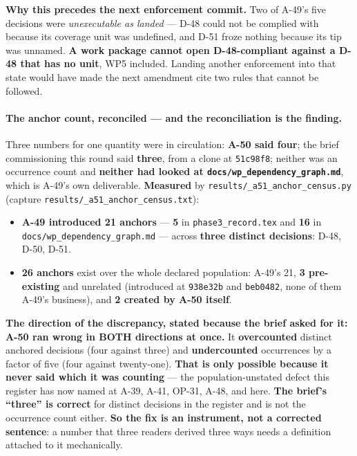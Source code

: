 \documentclass[
  10pt,
]{article}
\providecommand{\tightlist}{%
  \setlength{\itemsep}{0pt}\setlength{\parskip}{0pt}}
\begin{document}
\textbf{Why this precedes the next enforcement commit.} Two of A-49's five decisions were \emph{unexecutable as landed} --- D-48 could not be complied with because its coverage unit was undefined, and D-51 froze nothing because its tip was unnamed. \textbf{A work package cannot open D-48-compliant against a D-48 that has no unit}, WP5 included. Landing another enforcement into that state would have made the next amendment cite two rules that cannot be followed.

\paragraph{The anchor count, reconciled --- and the reconciliation is the finding.}
Three numbers for one quantity were in circulation: \textbf{A-50 said four}; the brief commissioning this round said \textbf{three}, from a clone at \texttt{51c98f8}; neither was an occurrence count and \textbf{neither had looked at \texttt{docs/wp\_dependency\_graph.md}}, which is A-49's own deliverable. \textbf{Measured} by \texttt{results/\allowbreak{}\_a51\_anchor\_census.py} (capture \texttt{results/\allowbreak{}\_a51\_anchor\_census.txt}):

\begin{itemize}
\tightlist
\item \textbf{A-49 introduced 21 anchors} --- \textbf{5} in \texttt{phase3\_record.tex} and \textbf{16} in \texttt{docs/\allowbreak{}wp\_dependency\_graph.md} --- across \textbf{three distinct decisions}: D-48, D-50, D-51.
\item \textbf{26 anchors} exist over the whole declared population: A-49's 21, \textbf{3 pre-existing} and unrelated (introduced at \texttt{938e32b} and \texttt{beb0482}, none of them A-49's business), and \textbf{2 created by A-50 itself}.
\end{itemize}

\textbf{The direction of the discrepancy, stated because the brief asked for it: A-50 ran wrong in BOTH directions at once.} It \textbf{overcounted} distinct anchored decisions (four against three) and \textbf{undercounted} occurrences by a factor of five (four against twenty-one). \textbf{That is only possible because it never said which it was counting} --- the population-unstated defect this register has now named at A-39, A-41, OP-31, A-48, and here. \textbf{The brief's ``three'' is correct} for distinct decisions in the register and is not the occurrence count either. \textbf{So the fix is an instrument, not a corrected sentence}: a number that three readers derived three ways needs a definition attached to it mechanically.
\end{document}
